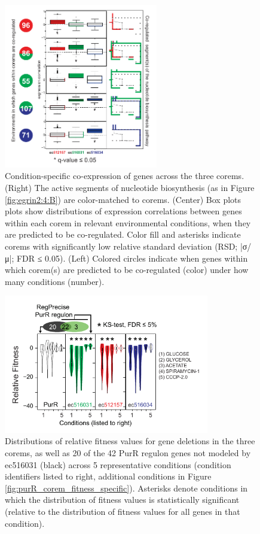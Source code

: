 \begin{figure}[h!]
    \centering
    \includegraphics[width=0.6\textwidth]{figures/egrin2_ecoli_3}
 	\caption[Differential co-expression across the nucleotide biosynthesis pathway, \eco ]{Condition-specific co-expression of genes across the three corems. (Right) The active segments of nucleotide biosynthesis (as in Figure \ref{fig:egrin2:4:B}) are color-matched to corems. (Center) Box plots plots show distributions of expression correlations between genes within each corem in relevant environmental conditions, when they are predicted to be co-regulated. Color fill and asterisks indicate corems with significantly low relative standard deviation (RSD; |σ/μ|; FDR ≤ 0.05). (Left) Colored circles indicate when genes within which corem(s) are predicted to be co-regulated (color) under how many conditions (number). 
}
    \label{fig:egrin2:4:C}
\end{figure}

\begin{figure}[h!]
    \centering
    \includegraphics[width=0.8\textwidth]{figures/egrin2_ecoli_4}
 	\caption[Condition-specific fitness contributions across nucleotide biosynthesis pathway predicted by corems, \eco]{Distributions of relative fitness values for gene deletions in the three corems, as well as 20 of the 42 PurR regulon genes not modeled by ec516031 (black) across 5 representative conditions (condition identifiers listed to right, additional conditions in Figure \ref{fig:purR_corem_fitness_specific}). Asterisks denote conditions in which the distribution of fitness values is statistically significant (relative to the distribution of fitness values for all genes in that condition).
}
    \label{fig:egrin2:4:D}
\end{figure}

